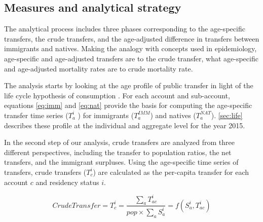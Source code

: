 \subsection{Measures and analytical strategy}

The analytical process includes three phases corresponding to the age-specific transfers, the crude transfers, and the age-adjusted difference in transfers between immigrants and natives.
Making the analogy with concepts used in epidemiology, age-specific and age-adjusted transfers are to the crude transfer, what age-specific and age-adjusted mortality rates are to crude mortality rate.

\vspace{0.7em}\par
The analysis starts by looking at the age profile of public transfer in light of the life cycle hypothesis of consumption \citep{Ando:1963ea,Deaton:2005vr}.
For each account and sub-account, equations \eqref{eq:imm} and \eqref{eq:nat} provide the basis for computing the age-specific transfer time series (\( T^{i}_a \) ) for immigrants (\(T^{IMM}_a\)) and natives (\( T^{NAT}_a \)). \autoref{sec:life} describes these profile at the individual and aggregate level for the year 2015.

\vspace{0.7em}\par
In the second step of our analysis, crude transfers are analyzed from three different perspectives, including the transfer to population ratios, the net transfers, and the immigrant surpluses.
Using the age-specific time series of transfers, crude transfers (\(T^{i}_c \)) are calculated as the per-capita transfer for each account \(c \) and residency status \(i\).

\begin{equation}\label{eq:pc}
  Crude Transfer=T^{i}_c= \frac{\displaystyle\sum_{a}T^{i}_{ac} }{ pop \times \displaystyle\sum_{a} S^{i}_a}=f(S^{i}_a, T^{i}_{ac})
\end{equation}

